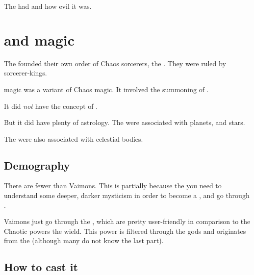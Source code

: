 The \Ortaicans had  and how evil it was. 














\section{\Rethyaxes and magic}
The \Ortaicans{} founded their own order of Chaos sorcerers, the \rethyaxes. 
They were ruled by \rethyax{} sorcerer-kings. 

\Rethyactic magic was a variant of \Draconic{} Chaos magic. 
It involved the summoning of . 

It did \emph{not} have the concept of . 

But it did have plenty of astrology. 
The \daemons{} were associated with planets,  and stars. 

The  were also associated with celestial bodies. 









\subsection{Demography}
There are fewer \rethyaxes{} than Vaimons. 
This is partially because the you need to understand some deeper, darker mysticism in order to become a \rethyax, and go through . 

Vaimons just go through the \Archons, which are pretty user-friendly in comparison to the Chaotic powers the \rethyaxes{} wield. 
This power is filtered through the \Ortaican{} gods and originates from the \xss{} (although many \rethyaxes{} do not know the last part). 









\subsection{How to cast it}





